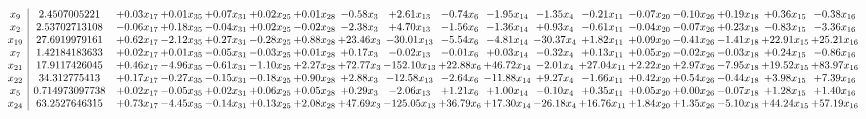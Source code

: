 \documentclass[9pt]{article}
\begin{document}
 \[\begin{array}{c| c c@{\hskip 2pt} c@{\hskip 2pt} c@{\hskip 2pt} c@{\hskip 2pt} c@{\hskip 2pt} c@{\hskip 2pt} c@{\hskip 2pt} c@{\hskip 2pt} c@{\hskip 2pt} c@{\hskip 2pt} c@{\hskip 2pt} c@{\hskip 2pt} c@{\hskip 2pt} c@{\hskip 2pt} c@{\hskip 2pt} c@{\hskip 2pt} }
 x_{9}   &  2.4507005221 & +  0.03 x_{17} & +  0.01 x_{35} & +  0.07 x_{31} & +  0.02 x_{25} & +  0.01 x_{28} & -0.58 x_{3} & +  2.61 x_{13} & -0.74 x_{6} & -1.95 x_{14} & -1.35 x_{4} & -0.21 x_{11} & -0.07 x_{20} & -0.10 x_{26} & +  0.19 x_{18} & +  0.36 x_{15} & -0.38 x_{16}\\
 x_{2}   &  2.53702713108 & -0.06 x_{17} & +  0.18 x_{35} & -0.04 x_{31} & +  0.02 x_{25} & -0.02 x_{28} & -2.38 x_{3} & +  4.70 x_{13} & -1.56 x_{6} & -1.36 x_{14} & +  0.93 x_{4} & -0.61 x_{11} & -0.04 x_{20} & -0.07 x_{26} & +  0.23 x_{18} & -0.83 x_{15} & -3.36 x_{16}\\
 x_{19}   &  27.6919979161 & +  0.62 x_{17} & -2.12 x_{35} & +  0.27 x_{31} & -0.28 x_{25} & +  0.88 x_{28} & + 23.46 x_{3} & -30.01 x_{13} & -5.54 x_{6} & -4.81 x_{14} & -30.37 x_{4} & +  1.82 x_{11} & +  0.09 x_{20} & -0.41 x_{26} & -1.41 x_{18} & + 22.91 x_{15} & + 25.21 x_{16}\\
 x_{7}   &  1.42184183633 & +  0.02 x_{17} & +  0.01 x_{35} & -0.05 x_{31} & -0.03 x_{25} & +  0.01 x_{28} & +  0.17 x_{3} & -0.02 x_{13} & -0.01 x_{6} & +  0.03 x_{14} & -0.32 x_{4} & +  0.13 x_{11} & +  0.05 x_{20} & -0.02 x_{26} & -0.03 x_{18} & +  0.24 x_{15} & -0.86 x_{16}\\
 x_{21}   &  17.9117426045 & +  0.46 x_{17} & -4.96 x_{35} & -0.61 x_{31} & -1.10 x_{25} & +  2.27 x_{28} & + 72.77 x_{3} & -152.10 x_{13} & + 22.88 x_{6} & + 46.72 x_{14} & -2.01 x_{4} & + 27.04 x_{11} & +  2.22 x_{20} & +  2.97 x_{26} & -7.95 x_{18} & + 19.52 x_{15} & + 83.97 x_{16}\\
 x_{22}   &  34.312775413 & +  0.17 x_{17} & -0.27 x_{35} & -0.15 x_{31} & -0.18 x_{25} & +  0.90 x_{28} & +  2.88 x_{3} & -12.58 x_{13} & -2.64 x_{6} & -11.88 x_{14} & +  9.27 x_{4} & -1.66 x_{11} & +  0.42 x_{20} & +  0.54 x_{26} & -0.44 x_{18} & +  3.98 x_{15} & +  7.39 x_{16}\\
 x_{5}   &  0.714973097738 & +  0.02 x_{17} & -0.05 x_{35} & +  0.02 x_{31} & +  0.06 x_{25} & +  0.05 x_{28} & +  0.29 x_{3} & -2.06 x_{13} & +  1.21 x_{6} & +  1.00 x_{14} & -0.10 x_{4} & +  0.35 x_{11} & +  0.05 x_{20} & +  0.00 x_{26} & -0.07 x_{18} & +  1.28 x_{15} & +  1.40 x_{16}\\
 x_{24}   &  63.2527646315 & +  0.73 x_{17} & -4.45 x_{35} & -0.14 x_{31} & +  0.13 x_{25} & +  2.08 x_{28} & + 47.69 x_{3} & -125.05 x_{13} & + 36.79 x_{6} & + 17.30 x_{14} & -26.18 x_{4} & + 16.76 x_{11} & +  1.84 x_{20} & +  1.35 x_{26} & -5.10 x_{18} & + 44.24 x_{15} & + 57.19 x_{16}\\

\end{array}\]
\end{document}
